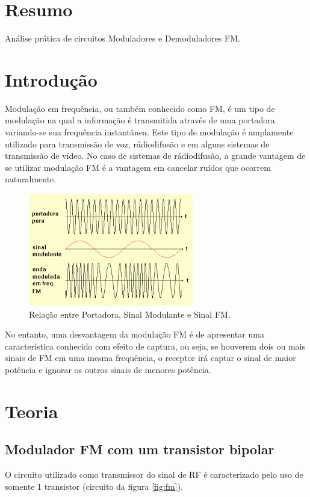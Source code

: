 \documentclass[12pt,a4paper]{article}%
\begin{document}


\section{Resumo}
Análise prática de circuitos Moduladores e Demoduladores FM.
\newpage


\newpage
\section{Introdução}
Modulação em frequência, ou também conhecido como FM, é um tipo de modulação na qual a informação é transmitida através de uma portadora variando-se sua frequência instantânea. Este tipo de modulação é amplamente utilizado para transmissão de voz, rádiodifusão e em alguns sistemas de transmissão de vídeo. No caso de sistemas de rádiodifusão, a grande vantagem de se utilizar modulação FM é a vantagem em cancelar ruídos que ocorrem naturalmente. 

\begin{figure}[H]
\centering
\includegraphics{imagem/sinal.png}
\caption{Relação entre Portadora, Sinal Modulante e Sinal FM.}
\label{fig:sinal}
\end{figure}

No entanto, uma desvantagem da modulação FM é de apresentar uma característica conhecido com efeito de captura, ou seja, se houverem dois ou mais sinais de FM em uma mesma frequência, o receptor irá captar o sinal de maior potência e ignorar os outros sinais de menores potência.


\newpage
\section{Teoria}

\subsection{Modulador FM com um transistor bipolar}
O circuito utilizado como transmissor do sinal de RF é caracterizado pelo uso de somente 1 transistor (circuito da figura \ref{fig:fm}).
\end{document}

